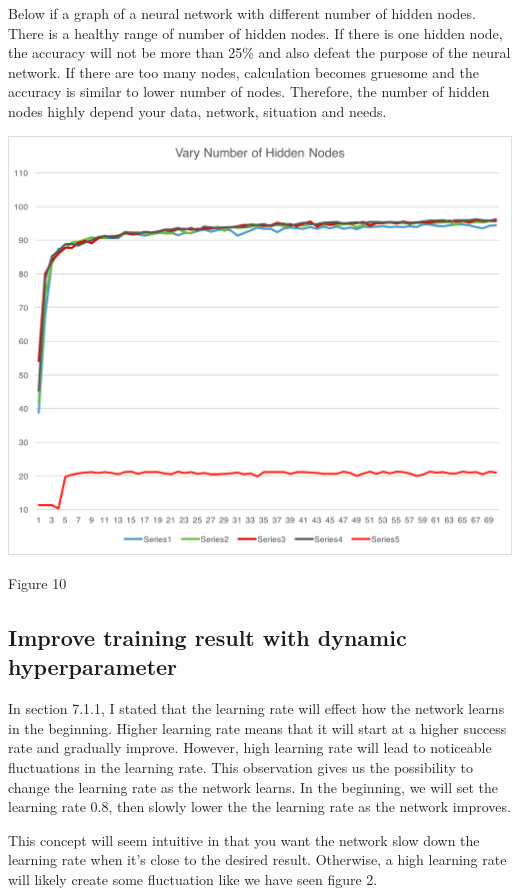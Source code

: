 \documentclass[]{article}
\begin{document}
\begin{multicols}{2}
Below if a graph of a neural network with different number of hidden nodes. There is a healthy range of number of hidden nodes. If there is one hidden node, the accuracy will not be more than 25\% and also defeat the purpose of the neural network. If there are too many nodes, calculation becomes gruesome and the accuracy is similar to lower number of nodes. Therefore, the number of hidden nodes highly depend your data, network, situation and needs. 

\centerline{\includegraphics[width=1\linewidth]{graph6}}
\centerline{Figure 10}
\vspace{0.5cm}

\subsection{Improve training result with dynamic hyperparameter}

In section 7.1.1, I stated that the learning rate will effect how the network learns in the beginning. Higher learning rate means that it will start at a higher success rate and gradually improve. However, high learning rate will lead to noticeable fluctuations in the learning rate. This observation gives us the possibility to change the learning rate as the network learns. In the beginning, we will set the learning rate 0.8, then slowly lower the the learning rate as the network improves. 

This concept will seem intuitive in that you want the network slow down the learning rate when it's close to the desired result. Otherwise, a high learning rate will likely create some fluctuation like we have seen figure 2. 


\end{multicols}
\end{document}
